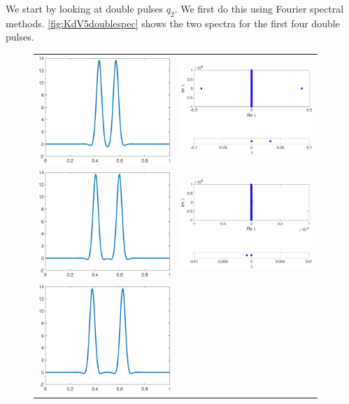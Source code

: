 \documentclass[thesis.tex]{subfiles}
\begin{document}
We start by looking at double pulses $q_2$. We first do this using Fourier spectral methods. \cref{fig:KdV5doublespec} shows the two spectra for the first four double pulses.
\begin{figure}
\begin{center}
\begin{tabular}{cc}
\includegraphics[width=5cm]{images/kdv5numerics/double1} &
\includegraphics[width=5cm]{images/kdv5numerics/double1spec} \\
\includegraphics[width=5cm]{images/kdv5numerics/double2} &
\includegraphics[width=5cm]{images/kdv5numerics/double2spec} \\
\includegraphics[width=5cm]{images/kdv5numerics/double3} &

\end{tabular}
\end{center}
\end{figure}
\end{document}

